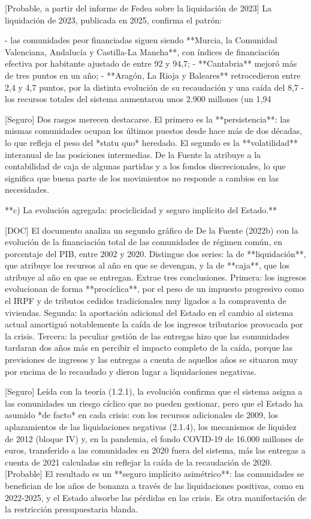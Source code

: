 \documentclass[10pt,a4paper]{article}
\begin{document}
[Probable, a partir del informe de Fedea sobre la liquidación de 2023] La liquidación de 2023, publicada en 2025, confirma el patrón:

- las comunidades peor financiadas siguen siendo **Murcia, la Comunidad Valenciana, Andalucía y Castilla-La Mancha**, con índices de financiación efectiva por habitante ajustado de entre 92 y 94,7;
- **Cantabria** mejoró más de tres puntos en un año;
- **Aragón, La Rioja y Baleares** retrocedieron entre 2,4 y 4,7 puntos, por la distinta evolución de su recaudación y una caída del 8,7%
- los recursos totales del sistema aumentaron unos 2.900 millones (un 1,94%

[Seguro] Dos rasgos merecen destacarse. El primero es la **persistencia**: las mismas comunidades ocupan los últimos puestos desde hace más de dos décadas, lo que refleja el peso del *statu quo* heredado. El segundo es la **volatilidad** interanual de las posiciones intermedias. De la Fuente la atribuye a la contabilidad de caja de algunas partidas y a los fondos discrecionales, lo que significa que buena parte de los movimientos no responde a cambios en las necesidades.

**c) La evolución agregada: prociclicidad y seguro implícito del Estado.**

[DOC] El documento analiza un segundo gráfico de De la Fuente (2022b) con la evolución de la financiación total de las comunidades de régimen común, en porcentaje del PIB, entre 2002 y 2020. Distingue dos series: la de **liquidación**, que atribuye los recursos al año en que se devengan, y la de **caja**, que los atribuye al año en que se entregan. Extrae tres conclusiones. Primera: los ingresos evolucionan de forma **procíclica**, por el peso de un impuesto progresivo como el IRPF y de tributos cedidos tradicionales muy ligados a la compraventa de viviendas. Segunda: la aportación adicional del Estado en el cambio al sistema actual amortiguó notablemente la caída de los ingresos tributarios provocada por la crisis. Tercera: la peculiar gestión de las entregas hizo que las comunidades tardaran dos años más en percibir el impacto completo de la caída, porque las previsiones de ingresos y las entregas a cuenta de aquellos años se situaron muy por encima de lo recaudado y dieron lugar a liquidaciones negativas.

[Seguro] Leída con la teoría (1.2.1), la evolución confirma que el sistema asigna a las comunidades un riesgo cíclico que no pueden gestionar, pero que el Estado ha asumido *de facto* en cada crisis: con los recursos adicionales de 2009, los aplazamientos de las liquidaciones negativas (2.1.4), los mecanismos de liquidez de 2012 (bloque IV) y, en la pandemia, el fondo COVID-19 de 16.000 millones de euros, transferido a las comunidades en 2020 fuera del sistema, más las entregas a cuenta de 2021 calculadas sin reflejar la caída de la recaudación de 2020. [Probable] El resultado es un **seguro implícito asimétrico**: las comunidades se benefician de los años de bonanza a través de las liquidaciones positivas, como en 2022-2025, y el Estado absorbe las pérdidas en las crisis. Es otra manifestación de la restricción presupuestaria blanda.
\end{document}
